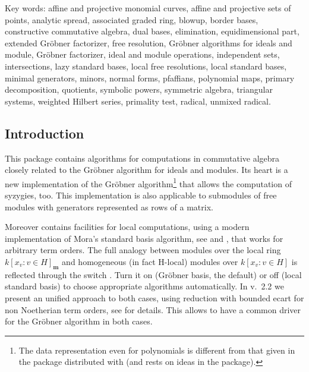 
\newcommand{\ind}[1]{\emph{#1}\index{#1!Cali package@\textsc{Cali} package}}
\newcommand{\indf}[2]{\f{#1}\ttindextype[CALI]{#1}{#2}}
\newcommand{\indid}[1]{\texttt{#1}\ttindextype[CALI]{#1}{symbol}}
\newcommand{\indsw}[1]{\sw{#1}\ttindexswitch[CALI]{#1}}

Key words:
affine and projective monomial curves,
affine and projective sets of points,
analytic spread,
associated graded ring,
blowup,
border bases,
constructive commutative algebra,
dual bases,
elimination,
equidimensional part,
extended Gr\"obner factorizer,
free resolution,
Gr\"obner algorithms for ideals and module,
Gr\"obner factorizer,
ideal and module operations,
independent sets,
intersections,
lazy standard bases,
local free resolutions,
local standard bases,
minimal generators,
minors,
normal forms,
pfaffians,
polynomial maps,
primary decomposition,
quotients,
symbolic powers,
symmetric algebra,
triangular systems,
weighted Hilbert series,
primality test,
radical,
unmixed radical.


\subsection{Introduction}

This package contains algorithms for computations in commutative
algebra closely related to the Gr\"obner algorithm for ideals and modules.
Its heart is a new implementation of the Gr\"obner algorithm\footnote{The
data representation even for polynomials is different from that given
in the  package distributed with \REDUCE (and rests on ideas
 in the  package).} that allows the computation of
syzygies, too. This implementation is also applicable to submodules of
free modules with generators represented as rows of a matrix.

Moreover  contains facilities for local computations, using a
modern implementation of Mora's standard basis algorithm, see
\cite{MoraPfisterTraverso:92} and \cite{Graebe:94}, that works for arbitrary term orders.
The full analogy between modules over the local ring \linebreak[1]
$k[x_v:v\in H]_{\mathbf{m}}$ and homogeneous (in fact H-local) modules
over $k[x_v:v\in H]$ is reflected through the switch
.
Turn it on (Gr\"obner basis, the default) or off (local
standard basis) to choose appropriate algorithms
automatically. In v.~2.2 we present an unified approach to both
cases, using reduction with bounded ecart for non Noetherian term
orders, see \cite{Graebe:95a} for details. This allows to have a common
driver for the Gr\"obner algorithm in both cases.


